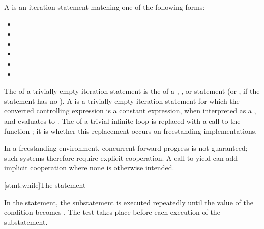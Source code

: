 \pnum
A  is
an iteration statement matching one of the following forms:
\begin{itemize}
\item {}  \tcode{) ;}
\item {}  \tcode{) \{ \}}
\item {}  \tcode{) ;}
\item {}  \tcode{) ;}
\item {}   \tcode{; ) ;}
\item {}   \tcode{; ) \{ \}}
\end{itemize}
The  of a trivially empty iteration statement
is the  of
a , , or  statement
(or , if the  statement has no ).
A  is a trivially empty iteration statement
for which the converted controlling expression is a constant expression,
when interpreted as a , and
evaluates to .
The  of a trivial infinite loop is replaced with
a call to the function ;
it is 
whether this replacement occurs on freestanding implementations.
\begin{note}
In a freestanding environment,
concurrent forward progress is not guaranteed;
such systems therefore require explicit cooperation.
A call to yield can add implicit cooperation where none is otherwise intended.
\end{note}

[stmt.while]{The  statement}%

\pnum
In the  statement, the substatement is executed repeatedly
until the value of the condition becomes
. The test takes place before each execution of the
substatement.

